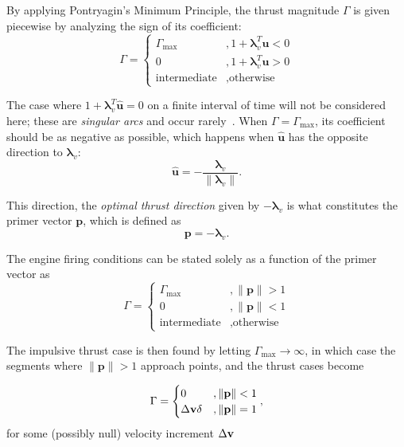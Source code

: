 By applying Pontryagin's Minimum Principle, the thrust magnitude \(\Gamma\) is given piecewise by analyzing the sign of its coefficient:
\begin{equation}
    \Gamma = \begin{cases}
        \Gamma_{\max}&, 1+\mathbf{\lambda}_v^T \hat{\mathbf{u}} < 0 \\
        0&, 1 + \mathbf{\lambda}_v^T \hat{\mathbf{u}} > 0 \\
        \text{intermediate}&, \text{otherwise}
    \end{cases}
\end{equation}

The case where \(1 + \mathbf{\lambda}_v^T \hat{\mathbf{u}} = 0\) on a finite interval of time will not be considered here; these are \textit{singular arcs} and occur rarely~\cite{singular_arcs}. When \(\Gamma = \Gamma_{\max}\), its coefficient should be as negative as possible, which happens when \(\hat{\mathbf{u}}\) has the opposite direction to \(\mathbf{\lambda}_v\):
\begin{equation}
    \hat{\mathbf{u}} = - \frac{\mathbf{\lambda}_v}{\lVert \mathbf{\lambda}_v \rVert}.
\end{equation}

This direction, the \textit{optimal thrust direction} given by \(-\mathbf{\lambda}_v\) is what constitutes the primer vector \(\mathbf{p}\), which is defined as 
\begin{equation}\label{eq:p_lambda_v_cons}
    \mathbf{p} = -\mathbf{\lambda}_v.
\end{equation}

The engine firing conditions can be stated solely as a function of the primer vector as~\cite{Conway_2010}
\begin{equation}
    \Gamma = \begin{cases}
        \Gamma_{\max}&, \lVert \mathbf{p} \rVert > 1 \\
        0&, \lVert \mathbf{p} \rVert < 1 \\
        \text{intermediate}&, \text{otherwise}
    \end{cases}
\end{equation}

The impulsive thrust case is then found by letting \(\Gamma_{\max} \rightarrow \infty\), in which case the segments where \(\lVert \mathbf{p} \rVert > 1\) approach points, and the thrust cases become

\begin{equation}
    \Gamma = \begin{cases}
        0&, \lVert \mathbf{p} \rVert < 1 \\
        \Delta \mathbf{v} \delta&, \lVert \mathbf{p} \rVert = 1 \\
    \end{cases},
\end{equation}
for some (possibly null) velocity increment \(\Delta \mathbf{v}\)

